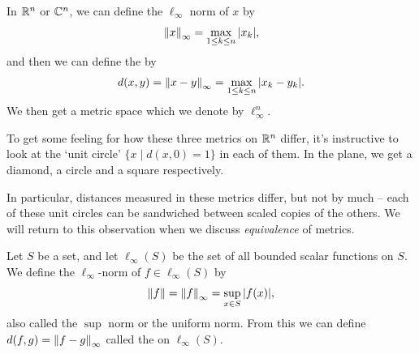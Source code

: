 \documentclass[a4paper]{scrartcl}
\begin{document}
\begin{example}
In $\mathbb{R}^n$ or $\mathbb{C}^n$, we can define the $\ell_{\infty}$ norm of $x$ by
$$
    \norm{x}_{\infty} = \max_{1 \leq k \leq n} |x_k|,
$$
and then we can define the  by
$$
d(x, y) = \norm{x - y}_{\infty} = \max_{1 \leq k \leq n} |x_k - y_k|.
$$
We then get a metric space which we denote by $\ell_{\infty}^n$.
\end{example}

To get some feeling for how these three metrics on $\mathbb{R}^n$ differ, it's instructive to look at the `unit circle' $\{x \mid d(x, 0) = 1\}$ in each of them. In the plane, we get a diamond, a circle and a square respectively.

\begin{center}
\end{center}

In particular, distances measured in these metrics differ, but not by much -- each of these unit circles can be sandwiched between scaled copies of the others. We will return to this observation when we discuss \emph{equivalence} of metrics.

\begin{example}
    Let $S$ be a set, and let $\ell_{\infty}(S)$ be the set of all bounded scalar functions on $S$. We define the $\ell_{\infty}$-norm of $f \in \ell_{\infty}(S)$ by
    $$
    \norm{f} = \norm{f}_{\infty} = \sup_{x \in S}|f(x)|,
    $$
    also called the $\sup$ norm or the uniform norm. From this we can define $d(f, g) = \norm{f - g}_{\infty}$ called the  on $\ell_{\infty}(S)$.
\end{example}
\end{document}
